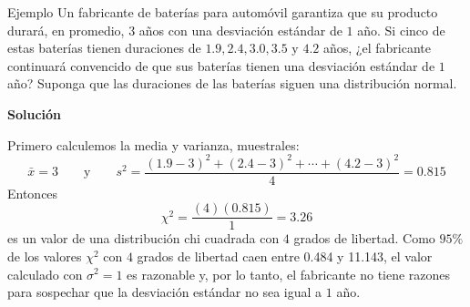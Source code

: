 \documentclass[
  10pt,
  ignorenonframetext,
]{beamer}
\begin{document}
\begin{frame}{}
\protect\hypertarget{section-49}{}
\begin{block}{Ejemplo}
\protect\hypertarget{ejemplo-2}{}
Un fabricante de baterías para automóvil garantiza que su producto
durará, en promedio, \(3\) años con una desviación estándar de \(1\)
año. Si cinco de estas baterías tienen duraciones de
\(1.9, 2.4, 3.0, 3.5\mbox{ y }4.2\) años, ¿el fabricante continuará
convencido de que sus baterías tienen una desviación estándar de \(1\)
año? Suponga que las duraciones de las baterías siguen una distribución
normal.

\textbf{Solución}

Primero calculemos la media y varianza, muestrales:
\[\bar{x}=3 \qquad \mbox{y} \qquad s^2 = \frac{(1.9-3)^2 + (2.4-3)^2 + \cdots + (4.2-3)^2}{4}=0.815\]
Entonces \[\chi^2=\frac{(4)(0.815)}{1}=3.26\] es un valor de una
distribución chi cuadrada con \(4\) grados de libertad. Como \(95\%\) de
los valores \(\chi^2\) con \(4\) grados de libertad caen entre 0.484 y
11.143, el valor calculado con \(\sigma^2 = 1\) es razonable y, por lo
tanto, el fabricante no tiene razones para sospechar que la desviación
estándar no sea igual a \(1\) año.
\end{block}
\end{frame}
\end{document}
